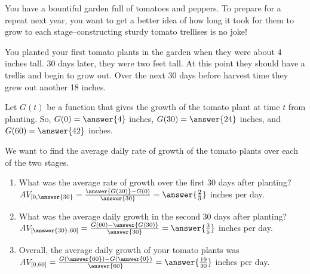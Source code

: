 \documentclass{ximera}
\author{Elizabeth Campolongo}
\begin{document}
\begin{exercise}
You have a bountiful garden full of tomatoes and peppers. To prepare for a repeat next year, you want to get a better idea of how long it took for them to grow to each stage--constructing sturdy tomato trellises is no joke!

You planted your first tomato plants in the garden when they were about 4 inches tall. 30 days later, they were two feet tall. At this point they should have a trellis and begin to grow out. Over the next 30 days before harvest time they grew out another 18 inches. 

Let $G(t)$ be a function that gives the growth of the tomato plant at time $t$ from planting. So, $G(0) = \answer{4}$ inches, $G(30) = \answer{24}$ inches, and $G(60) = \answer{42}$ inches.
%
\begin{exercise}
We want to find the average daily rate of growth of the tomato plants over each of the two stages.
\begin{enumerate}
\item What was the average rate of growth over the first 30 days after planting? \\

$AV_{[0,\answer{30}} = \frac{\answer{G(30)} - G(0)}{\answer{30}} = \answer{\frac{2}{3}}$ inches per day.

\item What was the average daily growth in the second 30 days after planting?\\
$AV_{[\answer{30},60]} = \frac{G(60)- \answer{G(30)}}{\answer{30}} = \answer{\frac{3}{5}}$ inches per day.

\item Overall, the average daily growth of your tomato plants was \\
$AV_{[0,60]} = \frac{G(\answer{60})- G(\answer{0})}{\answer{60}} = \answer{\frac{19}{30}}$ inches per day.



\end{enumerate}
\end{exercise}
\end{exercise}
\end{document}
